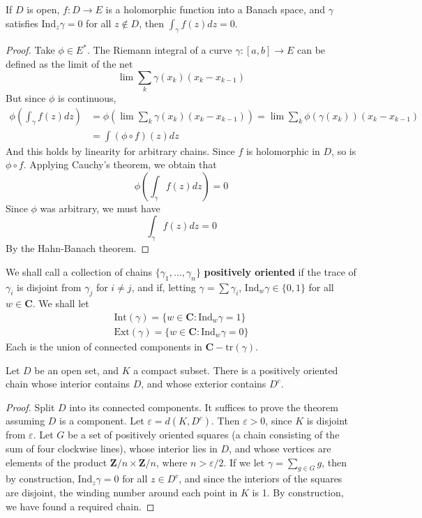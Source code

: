 \begin{lemma} \label{banachcauchy}
    If $D$ is open, $f: D \to E$ is a holomorphic function into a Banach space, and $\gamma$ satisfies $\text{Ind}_z \gamma = 0$ for all $z \not\in D$, then $\int_\gamma f(z) dz = 0$.
\end{lemma}
\begin{proof}
    Take $\phi \in E^*$. The Riemann integral of a curve $\gamma: [a,b] \to E$ can be defined as the limit of the net
    \[ \lim \sum_k \gamma(x_k) (x_k - x_{k-1}) \]
    But since $\phi$ is continuous,
    \begin{align*}
        \phi \left( \int_\gamma f(z) dz \right) &= \phi \left(\lim \sum_k \gamma(x_k) (x_k - x_{k-1}) \right) = \lim \sum_k \phi(\gamma(x_k)) (x_k - x_{k-1})\\
        &= \int (\phi \circ f)(z) dz
    \end{align*}
    And this holds by linearity for arbitrary chains. Since $f$ is holomorphic in $D$, so is $\phi \circ f$. Applying Cauchy's theorem, we obtain that
    \[ \phi \left( \int_\gamma f(z) dz \right) = 0 \]
    Since $\phi$ was arbitrary, we must have
    \[ \int_\gamma f(z) dz = 0 \]
    By the Hahn-Banach theorem.
\end{proof}

We shall call a collection of chains $\{ \gamma_1, \dots, \gamma_n \}$ {\bf positively oriented} if the trace of $\gamma_i$ is disjoint from $\gamma_j$ for $i \neq j$, and if, letting $\gamma = \sum \gamma_i$, $\text{Ind}_w \gamma \in \{ 0,1 \}$ for all $w \in \mathbf{C}$. We shall let
%
\begin{align*}
    \text{Int}(\gamma) = \{ w \in \mathbf{C} : \text{Ind}_w \gamma = 1 \} \\
    \text{Ext}(\gamma) = \{ w \in \mathbf{C} : \text{Ind}_w \gamma = 0 \}
\end{align*}
%
Each is the union of connected components in $\mathbf{C} - \text{tr}(\gamma)$.

\begin{lemma}
    Let $D$ be an open set, and $K$ a compact subset. There is a positively oriented chain whose interior contains $D$, and whose exterior contains $D^c$.
\end{lemma}
\begin{proof}
    Split $D$ into its connected components. It suffices to prove the theorem assuming $D$ is a component. Let $\varepsilon = d(K,D^c)$. Then $\varepsilon > 0$, since $K$ is disjoint from $\varepsilon$. Let $G$ be a set of positively oriented squares (a chain consisting of the sum of four clockwise lines), whose interior lies in $D$, and whose vertices are elements of the product $\mathbf{Z}/n \times \mathbf{Z}/n$, where $n > \varepsilon / 2$. If we let $\gamma = \sum_{g \in G} g$, then by construction, $\text{Ind}_z \gamma = 0$ for all $z \in D^c$, and since the interiors of the squares are disjoint, the winding number around each point in $K$ is 1. By construction, we have found a required chain.
\end{proof}

